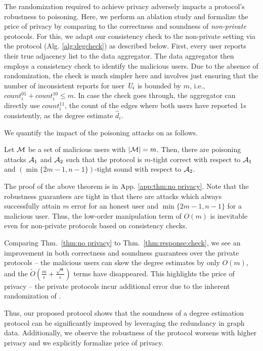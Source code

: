 The randomization required to achieve privacy adversely impacts a protocol's robustness to poisoning. Here, we perform an ablation study and formalize the price of privacy by comparing to the correctness and soundness of \textit{non-private} protocols. For this, we adapt our consistency check to the non-private setting via the \DegCheck{} protocol (Alg. \ref{alg:degcheck}) as described below. First, every user reports their true adjacency list to the data aggregator. The data aggregator then employs a consistency check to identify the malicious users. Due to the absence of randomization, the check is much simpler here and involves just ensuring that the number of inconsistent reports for user $\textit{U}_i$ is bounded by $m$, i.e., $count_i^{01}+count_i^{10} \leq m $. In case the check goes through, the aggregator can directly use $count_i^{11}$, the count of the edges where both users have reported $1$s consistently, as the degree estimate $\hat{d}_i$.

We quantify the impact of the poisoning attacks on  \DegCheck{} as follows.

\begin{thm}
Let $\mathcal{M}$ be a set of malicious users with $|\mathcal{M}| = m$. Then, there are poisoning attacks $\mathcal{A}_1$ and $\mathcal{A}_2$ such that
the \DegCheck{} protocol is $m$-tight correct with respect to $\mathcal{A}_1$ and $(\min\{2m-1,n-1\})$-tight sound with respect to $\mathcal{A}_2$. \label{thm:no privacy}
\end{thm}
The proof of the above theorem is in App. \ref{app:thm:no privacy}.
Note that the robustness guarantees are tight in that there are attacks which always successfully attain $m$ error for an honest user and $\min\{2m-1,n-1\}$ for a malicious user. Thus, the low-order manipulation term of $O(m)$ is inevitable  even for non-private protocols based on consistency checks. %

Comparing Thm.~\ref{thm:no privacy} to Thm.~\ref{thm:response:check}, we see an improvement in both correctness and soundness guarantees over the private protocols -- the malicious users can skew the degree estimates by only $O(m)$, and the $\tilde{O}(\frac{m}{\epsilon} + \frac{\sqrt{n}}{\epsilon})$ terms have disappeared. This highlights the price of privacy -- the private protocols incur additional error due to the inherent randomization of \ldp.

Thus, our proposed \DegRRCheck{} protocol shows that the soundness of a degree estimation protocol can be significantly improved by leveraging the redundancy in graph data. Additionally, we observe the robustness of the protocol worsens with higher privacy and we explicitly formalize price of privacy. 
